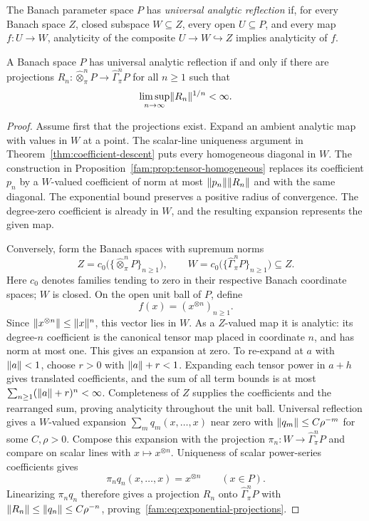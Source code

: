 \begin{definition}\label{fam:def:universal-reflection}
The Banach parameter space $P$ has \emph{universal analytic reflection} if, for every Banach space $Z$, closed
subspace $W\subseteq Z$, every open $U\subseteq P$, and every map $f\colon U\to W$, analyticity of
the composite $U\to W\hookrightarrow Z$ implies analyticity of $f$.
\end{definition}

\begin{theorem}\label{fam:thm:tensor-analytic}
A Banach space $P$ has universal analytic reflection if and only if there are projections
$R_n\colon \widehat\otimes^n_\pi P\to\widehat\Gamma^n_\pi P$ for all $n\ge1$ such that
\begin{equation}\label{fam:eq:exponential-projections}
 \limsup_{n\to\infty}\lVert R_n\rVert^{1/n}<\infty.
\end{equation}
\end{theorem}

\begin{proof}
Assume first that the projections exist. Expand an ambient analytic map with values in $W$ at a point.
The scalar-line uniqueness argument in Theorem~\ref{thm:coefficient-descent} puts every homogeneous diagonal in $W$.
The construction in Proposition~\ref{fam:prop:tensor-homogeneous} replaces its coefficient $p_n$ by a
$W$\nobreakdash-valued coefficient of norm at most $\lVert p_n\rVert\lVert R_n\rVert$ and with the same diagonal.
The exponential bound preserves a positive radius of convergence. The degree-zero coefficient is
already in $W$, and the resulting expansion represents the given map.

Conversely, form the Banach spaces with supremum norms
\[
 Z=c_0\bigl(\{\widehat\otimes^n_\pi P\}_{n\ge1}\bigr),\qquad
 W=c_0\bigl(\{\widehat\Gamma^n_\pi P\}_{n\ge1}\bigr)\subseteq Z.
\]
Here $c_0$ denotes families tending to zero in their respective Banach coordinate spaces; $W$ is closed.
On the open unit ball of $P$, define
\[
 f(x)=(x^{\otimes n})_{n\ge1}.
\]
Since $\lVert x^{\otimes n}\rVert\le\lVert x\rVert^n$, this vector lies in $W$.
As a $Z$\nobreakdash-valued map it is analytic: its degree-$n$ coefficient is the canonical tensor map
placed in coordinate $n$, and has norm at most one. This gives an expansion at zero. To re-expand
at $a$ with $\lVert a\rVert<1$, choose $r>0$ with $\lVert a\rVert+r<1$. Expanding each tensor power in $a+h$
gives translated coefficients, and the sum of all term bounds is at most
$\sum_{n\ge1}(\lVert a\rVert+r)^n<\infty$. Completeness of $Z$ supplies the coefficients and the
rearranged sum, proving analyticity throughout the unit ball. Universal reflection gives a $W$\nobreakdash-valued
expansion $\sum_mq_m(x,\ldots,x)$ near zero with $\lVert q_m\rVert\le C\rho^{-m}$ for some $C,\rho>0$.
Compose this expansion with the projection $\pi_n\colon W\to\widehat\Gamma^n_\pi P$ and compare on scalar lines
with $x\mapsto x^{\otimes n}$. Uniqueness of scalar power-series coefficients gives
\[
 \pi_nq_n(x,\ldots,x)=x^{\otimes n}\qquad(x\in P).
\]
Linearizing $\pi_nq_n$ therefore gives a projection $R_n$ onto $\widehat\Gamma^n_\pi P$ with
$\lVert R_n\rVert\le\lVert q_n\rVert\le C\rho^{-n}$, proving~\eqref{fam:eq:exponential-projections}.
\end{proof}

